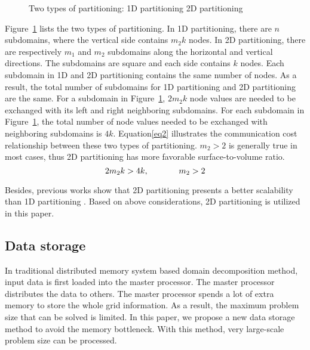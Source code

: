 \documentclass{sig-alternate}
\begin{document}
	\begin{figure}[htbp]
	  \caption{Two types of partitioning:
	   1D partitioning
	   2D partitioning }
	  \label{Fig3}
	\end{figure}
	Figure~\ref{Fig3} lists the two types of partitioning. In 1D partitioning, there are $n$ subdomains, where the vertical side 
	contains $m_2k$ nodes. In 2D partitioning, there are respectively $m_1$ and $m_2$ subdomains along the horizontal and 
	vertical directions. The subdomains are square and each side contains $k$ nodes. Each subdomain in 1D and 2D partitioning 
	contains the same number of nodes. As a result, the total number of subdomains for 1D partitioning and 2D partitioning are 
	the same.  For a subdomain in 
	Figure~\ref{Fig3}, $2m_2k$ node values are needed to be exchanged with its left and right 
	neighboring subdomains. For each subdomain in Figure~\ref{Fig3}, the total 
	number of node values needed to be exchanged with neighboring subdomains is $4k$. Equation\eqref{eq2} illustrates the 
	communication cost relationship between these two types of
	partitioning. $m_2>2$ is generally true in most cases, thus 2D partitioning has more favorable surface-to-volume 
	ratio.    
	\begin{equation}
		2m_2k > 4k, \hspace{0.5 in} m_2 > 2 \label{eq2}
	\end{equation}

	Besides, previous works show that 2D partitioning presents a better scalability than 1D partitioning \cite{Grama, Kumar}. 
	Based on above considerations, 2D partitioning is utilized in this paper. 
  \subsection{Data storage}
	In traditional distributed memory system based domain decomposition method, input data is first loaded into the master processor. 
	The master processor distributes the data to others. The master processor spends a lot of extra memory to store the whole grid 
	information. As a result, the maximum problem size that can be solved is limited. In this paper, we propose a new data storage 
	method to avoid the memory bottleneck. With this method, very large-scale problem size can be processed.
\end{document}
